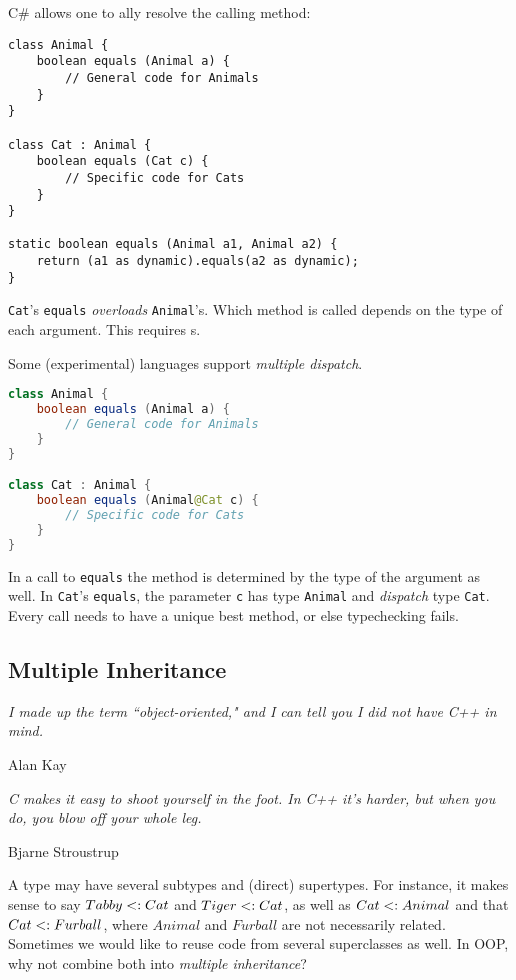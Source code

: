 \documentclass{article}
\begin{document}
\begin{example}
C\# allows one to \dynamic{}ally resolve the calling method:
\begin{lstlisting}[language = {[Sharp]C}, escapechar=|]
class Animal {
    boolean equals (Animal a) {
        // General code for Animals
    }
}

class Cat : Animal {
    boolean equals (Cat c) {
        // Specific code for Cats
    }
}

static boolean equals (Animal a1, Animal a2) {
    return (a1 as dynamic).equals(a2 as dynamic);
}
\end{lstlisting}
\texttt{Cat}'s \texttt{equals} \textit{overloads} \texttt{Animal}'s. Which method is called depends on the \textit{\runtime{}} type of each argument. This requires \runtimecheck{}s.
\end{example}

\begin{example}
Some (experimental) languages support \textit{multiple dispatch}.
\begin{lstlisting}[language=Java, escapechar=|]
class Animal {
    boolean equals (Animal a) {
        // General code for Animals
    }
}

class Cat : Animal {
    boolean equals (Animal@Cat c) {
        // Specific code for Cats
    }
}
\end{lstlisting}
In a call to \texttt{equals} the method is determined by the \dynamic{} type of the argument as well.
In \texttt{Cat}'s \texttt{equals}, the parameter \texttt{c} has \static{} type \texttt{Animal} and \textit{dispatch} type \texttt{Cat}. Every call needs to have a unique best method, or else typechecking fails.
\end{example}

\subsection{Multiple Inheritance}

\epigraph{\itshape I made up the term ``object-oriented," and I can tell you I did not have C++ in mind.}{Alan Kay}

\epigraph{\itshape C makes it easy to shoot yourself in the foot. In C++ it's harder, but when you do, you blow off your whole leg.}{Bjarne Stroustrup}

A type may have several subtypes and (direct) supertypes.
For instance, it makes sense to say $Tabby <: Cat$ and $Tiger <: Cat$, as well as $Cat <: Animal$ and that $Cat <: Furball$, where $Animal$ and $Furball$ are not necessarily related. Sometimes we would like to reuse code from several superclasses as well. In OOP, why not combine both into \textit{multiple inheritance}?
\end{document}
